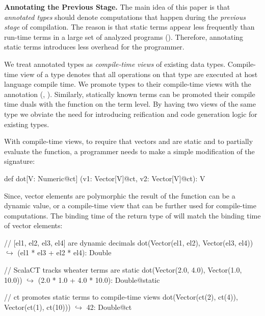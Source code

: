 {\bf Annotating the Previous Stage.} The main idea of this paper is that \emph{annotated types}
 should denote computations that happen during the \emph{previous stage} of compilation.
 The reason is that static terms appear less frequently than run-time terms in a large set
 of analyzed programs (). Therefore, annotating static terms
 introduces less overhead for the programmer.

We treat annotated types as \emph{compile-time views}
 of existing data types. Compile-time view of a type denotes that all operations on that type are
 executed at host language compile time. We promote types to their compile-time views
 with the  annotation (\eg, ). Similarly, statically known terms can be promoted
 their compile time duals with the  function on the term level.
 By having two views of the same type we obviate the need for introducing reification and code generation logic for
 existing types.

With compile-time views, to require that vectors  and  are
 static and to partially evaluate the function, a programmer needs to make
 a simple modification of the  signature:\begin{lstparagraph}
def dot[V: Numeric@ct]
  (v1: Vector[V]@ct, v2: Vector[V]@ct): V
\end{lstparagraph}

Since, vector elements are polymorphic the result
 of the function can be a dynamic value, or a compile-time view
 that can be further used for compile-time computations. The binding time of the return type
 of  will match the binding time of vector elements:

\vspace{1.8mm}
\begin{listing}[mathescape]
  // [el1, el2, el3, el4] are dynamic decimals
  dot(Vector(el1, el2), Vector(el3, el4))
    $\hookrightarrow$ (el1 * el3 + el2 * el4): Double

  // ScalaCT tracks wheater terms are static
  dot(Vector(2.0, 4.0), Vector(1.0, 10.0))
    $\hookrightarrow$ (2.0 * 1.0 + 4.0 * 10.0): Double@static

  // ct promotes static terms to compile-time views
  dot(Vector(ct(2), ct(4)),
      Vector(ct(1), ct(10)))
    $\hookrightarrow$ 42: Double@ct
\end{listing}
\vspace{1.8mm}

